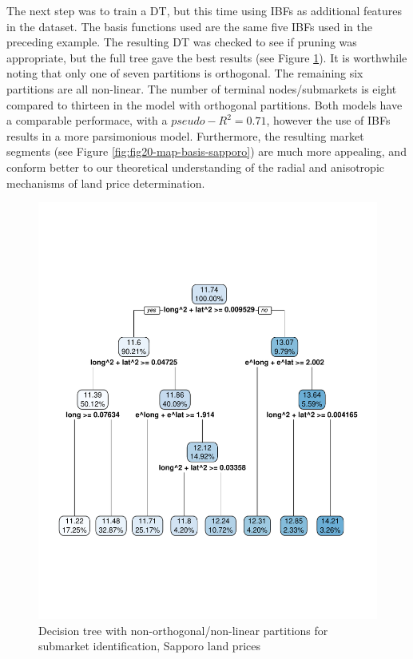 \documentclass[]{elsarticle} %
\makeatletter
\def\maxwidth{\ifdim\Gin@nat@width>\linewidth\linewidth
\else\Gin@nat@width\fi}
\let\Oldincludegraphics\includegraphics
\renewcommand{\includegraphics}[1]{\Oldincludegraphics[width=\maxwidth]{#1}}
\makeatother
\begin{document}
The next step was to train a DT, but this time using IBFs as additional
features in the dataset. The basis functions used are the same five IBFs
used in the preceding example. The resulting DT was checked to see if
pruning was appropriate, but the full tree gave the best results (see
Figure \ref{fig:fig19-tree-basis-sapporo}). It is worthwhile noting that
only one of seven partitions is orthogonal. The remaining six partitions
are all non-linear. The number of terminal nodes/submarkets is eight
compared to thirteen in the model with orthogonal partitions. Both
models have a comparable performace, with a \(pseudo-R^2=0.71\), however
the use of IBFs results in a more parsimonious model. Furthermore, the
resulting market segments (see Figure \ref{fig:fig20-map-basis-sapporo})
are much more appealing, and conform better to our theoretical
understanding of the radial and anisotropic mechanisms of land price
determination.

\begin{figure}
\centering
\includegraphics{Trees_with_Base_Functions_v2_files/figure-latex/fig19-tree-basis-sapporo-1.pdf}
\caption{\label{fig:fig19-tree-basis-sapporo}Decision tree with
non-orthogonal/non-linear partitions for submarket identification,
Sapporo land prices}
\end{figure}
\end{document}
